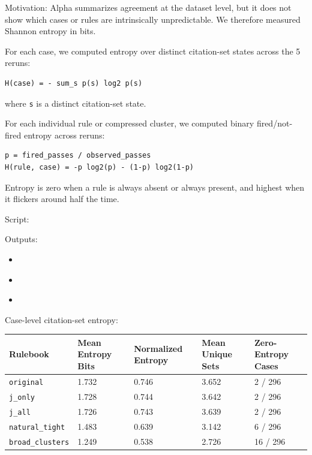 \documentclass[11pt]{article}
\begin{document}
Motivation: Alpha summarizes agreement at the dataset level, but it does not show which cases or rules are intrinsically unpredictable. We therefore measured Shannon entropy in bits.

For each case, we computed entropy over distinct citation-set states across the 5 reruns:

\begin{verbatim}
H(case) = - sum_s p(s) log2 p(s)
\end{verbatim}

where \texttt{s} is a distinct citation-set state.

For each individual rule or compressed cluster, we computed binary fired/not-fired entropy across reruns:

\begin{verbatim}
p = fired_passes / observed_passes
H(rule, case) = -p log2(p) - (1-p) log2(1-p)
\end{verbatim}

Entropy is zero when a rule is always absent or always present, and highest when it flickers around half the time.

Script:

\href{../scripts/measure_entropy.py}{}

Outputs:

\begin{itemize}[leftmargin=1.5em]
  \item \href{../results/entropy/case_entropy_summary_reruns.csv}{}
  \item \href{../results/entropy/case_entropy_reruns.csv}{}
  \item \href{../results/entropy/label_entropy_reruns.csv}{}
\end{itemize}

Case-level citation-set entropy:

\begin{longtable}{L{0.22\textwidth} R{0.16\textwidth} R{0.16\textwidth} R{0.16\textwidth} R{0.16\textwidth}}
\toprule
Rulebook & Mean Entropy Bits & Normalized Entropy & Mean Unique Sets & Zero-Entropy Cases \\
\midrule
\endhead
\texttt{original} & 1.732 & 0.746 & 3.652 & 2 / 296 \\
\texttt{j\_only} & 1.728 & 0.744 & 3.642 & 2 / 296 \\
\texttt{j\_all} & 1.726 & 0.743 & 3.639 & 2 / 296 \\
\texttt{natural\_tight} & 1.483 & 0.639 & 3.142 & 6 / 296 \\
\texttt{broad\_clusters} & 1.249 & 0.538 & 2.726 & 16 / 296 \\
\bottomrule
\end{longtable}
\end{document}
